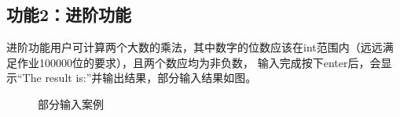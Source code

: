 \documentclass[a4paper, 11pt, UTF8]{ctexart}
\begin{document}
\subsection{功能2：进阶功能}

进阶功能用户可计算两个大数的乘法，其中数字的位数应该在int范围内（远远满足作业100000位的要求），且两个数应均为非负数，
输入完成按下enter后，会显示“The result is:”并输出结果，部分输入结果如图。

\begin{figure}[H]
    \centering
    \quad
    \quad
    \caption{部分输入案例}
\end{figure}
\end{document}
